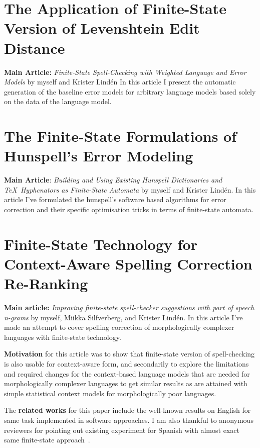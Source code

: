 \documentclass[officiallayout,draft]{unihelcompling}
\begin{document}
\section{The Application of Finite-State Version of Levenshtein Edit Distance}

\textbf{Main Article:} \emph{Finite-State Spell-Checking with Weighted Language
and Error Models} by myself and Krister Lindén
In this article I present the automatic generation of the baseline error
models for arbitrary language models based solely on the data of the language
model. 

\section{The Finite-State Formulations of Hunspell's Error Modeling}

\textbf{Main Article}: \emph{Building and Using Existing Hunspell Dictionaries
and \TeX\ Hyphenators as Finite-State Automata} by myself and Krister Lindén.
In this article I've formulated the hunspell's software based algorithms for
error correction and their specific optimisation tricks in terms of
finite-state automata.  

\section{Finite-State Technology for Context-Aware Spelling Correction
Re-Ranking}

\textbf{Main article:} \emph{Improving finite-state spell-checker suggestions
with part of speech n-grams} by myself, Miikka Silfverberg, and Krister
Lind\'{e}n. In this article I've made an attempt to cover spelling correction
of morphologically complexer languages with finite-state technology.

\textbf{Motivation} for this article was to show that finite-state version of
spell-checking is also usable for context-aware form, and secondarily to
explore the limitations and required changes for the context-based language
models that are needed for morphologically complexer languages to get similar
results as are attained with simple statistical context models for
morphologically poor languages. 

The \textbf{related works} for this paper include the well-known results on
English for same task implemented in software approaches. I am also thankful
to anonymous reviewers for pointing out existing experiment for Spanish with
almost exact same finite-state approach~\cite{otero}.
\end{document}
